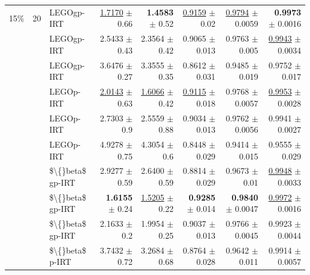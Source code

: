 \begin{longtable}{llp{}rrrrr}
\midrule
15\% & 20 & LEGOgp-IRT & \underline{1.7170} {\scriptsize $\pm$ 0.66} & \textbf{1.4583} {\scriptsize $\pm$ 0.52} & \underline{0.9159} {\scriptsize $\pm$ 0.02} & \underline{0.9794} {\scriptsize $\pm$ 0.0059} & \textbf{0.9973} {\scriptsize $\pm$ 0.0016} \\
 &  & LEGOgp-IRT & 2.5433 {\scriptsize $\pm$ 0.43} & 2.3564 {\scriptsize $\pm$ 0.42} & 0.9065 {\scriptsize $\pm$ 0.013} & 0.9763 {\scriptsize $\pm$ 0.005} & \underline{0.9943} {\scriptsize $\pm$ 0.0034} \\
 &  & LEGOgp-IRT & 3.6476 {\scriptsize $\pm$ 0.27} & 3.3555 {\scriptsize $\pm$ 0.35} & 0.8612 {\scriptsize $\pm$ 0.031} & 0.9485 {\scriptsize $\pm$ 0.019} & 0.9752 {\scriptsize $\pm$ 0.017} \\
 &  & LEGOp-IRT & \underline{2.0143} {\scriptsize $\pm$ 0.63} & \underline{1.6066} {\scriptsize $\pm$ 0.42} & \underline{0.9115} {\scriptsize $\pm$ 0.018} & 0.9768 {\scriptsize $\pm$ 0.0057} & \underline{0.9953} {\scriptsize $\pm$ 0.0028} \\
 &  & LEGOp-IRT & 2.7303 {\scriptsize $\pm$ 0.9} & 2.5559 {\scriptsize $\pm$ 0.88} & 0.9034 {\scriptsize $\pm$ 0.013} & 0.9762 {\scriptsize $\pm$ 0.0056} & 0.9941 {\scriptsize $\pm$ 0.0027} \\
 &  & LEGOp-IRT & 4.9278 {\scriptsize $\pm$ 0.75} & 4.3054 {\scriptsize $\pm$ 0.6} & 0.8448 {\scriptsize $\pm$ 0.029} & 0.9414 {\scriptsize $\pm$ 0.015} & 0.9555 {\scriptsize $\pm$ 0.029} \\
 &  & \$\textbackslash\{\}beta\$ gp-IRT & 2.9277 {\scriptsize $\pm$ 0.59} & 2.6400 {\scriptsize $\pm$ 0.59} & 0.8814 {\scriptsize $\pm$ 0.029} & 0.9673 {\scriptsize $\pm$ 0.01} & \underline{0.9948} {\scriptsize $\pm$ 0.0033} \\
 &  & \$\textbackslash\{\}beta\$ gp-IRT & \textbf{1.6155} {\scriptsize $\pm$ 0.24} & \underline{1.5205} {\scriptsize $\pm$ 0.22} & \textbf{0.9285} {\scriptsize $\pm$ 0.014} & \textbf{0.9840} {\scriptsize $\pm$ 0.0047} & \underline{0.9972} {\scriptsize $\pm$ 0.0016} \\
 &  & \$\textbackslash\{\}beta\$ gp-IRT & 2.1633 {\scriptsize $\pm$ 0.2} & 1.9954 {\scriptsize $\pm$ 0.25} & 0.9037 {\scriptsize $\pm$ 0.013} & 0.9766 {\scriptsize $\pm$ 0.0045} & 0.9923 {\scriptsize $\pm$ 0.0044} \\
 &  & \$\textbackslash\{\}beta\$ p-IRT & 3.7432 {\scriptsize $\pm$ 0.72} & 3.2684 {\scriptsize $\pm$ 0.68} & 0.8764 {\scriptsize $\pm$ 0.028} & 0.9642 {\scriptsize $\pm$ 0.011} & 0.9914 {\scriptsize $\pm$ 0.0057} \\

\end{longtable}
